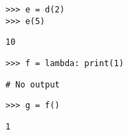 \begin{lstlisting}
>>> e = d(2)
>>> e(5)
\end{lstlisting}
\begin{solution}[0.2in]
\begin{lstlisting}
10
\end{lstlisting}
\end{solution}

\begin{lstlisting}
>>> f = lambda: print(1)
\end{lstlisting}
\begin{solution}[0.2in]
\begin{lstlisting}
# No output
\end{lstlisting}
\end{solution}

\begin{lstlisting}
>>> g = f()
\end{lstlisting}
\begin{solution}[0.2in]
\begin{lstlisting}
1
\end{lstlisting}
\end{solution}
